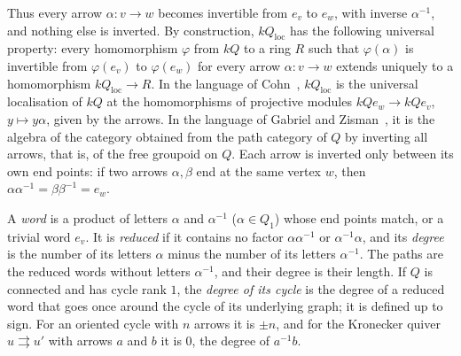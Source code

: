 \documentclass[12pt, a4paper]{report}
\theoremstyle{plain}
\theoremstyle{definition}
\theoremstyle{remark}
\theoremstyle{plain}
\begin{document}
Thus every arrow $\alpha:v\to w$ becomes invertible from $e_v$ to $e_w$, with inverse $\alpha^{-1}$, and nothing else is inverted. By construction, $kQ_{\mathrm{loc}}$ has the following universal property: every homomorphism $\varphi$ from $kQ$ to a ring $R$ such that $\varphi(\alpha)$ is invertible from $\varphi(e_v)$ to $\varphi(e_w)$ for every arrow $\alpha:v\to w$ extends uniquely to a homomorphism $kQ_{\mathrm{loc}}\to R$. In the language of Cohn~\cite{Cohn2006}, $kQ_{\mathrm{loc}}$ is the universal localisation of $kQ$ at the homomorphisms of projective modules $kQe_w\to kQe_v$, $y\mapsto y\alpha$, given by the arrows. In the language of Gabriel and Zisman~\cite{GabrielZisman1967}, it is the algebra of the category obtained from the path category of $Q$ by inverting all arrows, that is, of the free groupoid on $Q$. Each arrow is inverted only between its own end points: if two arrows $\alpha,\beta$ end at the same vertex $w$, then $\alpha\alpha^{-1}=\beta\beta^{-1}=e_w$.

A \emph{word} is a product of letters $\alpha$ and $\alpha^{-1}$ ($\alpha\in Q_1$) whose end points match, or a trivial word $e_v$. It is \emph{reduced} if it contains no factor $\alpha\alpha^{-1}$ or $\alpha^{-1}\alpha$, and its \emph{degree} is the number of its letters $\alpha$ minus the number of its letters $\alpha^{-1}$. The paths are the reduced words without letters $\alpha^{-1}$, and their degree is their length. If $Q$ is connected and has cycle rank $1$, the \emph{degree of its cycle} is the degree of a reduced word that goes once around the cycle of its underlying graph; it is defined up to sign. For an oriented cycle with $n$ arrows it is $\pm n$, and for the Kronecker quiver $u\rightrightarrows u'$ with arrows $a$ and $b$ it is $0$, the degree of $a^{-1}b$.
\end{document}
